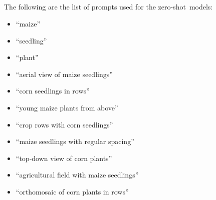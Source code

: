 \documentclass[12pt,a4paper,oneside]{report}
\renewcommand\thesection{2.1.\arabic{section}}
\begin{document}
\subsection[\appendixname~\thesubsection]{}
The following are the list of prompts used for the zero-shot~models:
\begin{itemize}
    \item ``maize''
    \item ``seedling''
    \item ``plant''
    \item ``aerial view of maize seedlings''
    \item ``corn seedlings in rows''
    \item ``young maize plants from above''
    \item ``crop rows with corn seedlings''
    \item ``maize seedlings with regular spacing''
    \item ``top-down view of corn plants''
    \item ``agricultural field with maize seedlings''
    \item ``orthomosaic of corn plants in rows''
\end{itemize}


\end{document}
